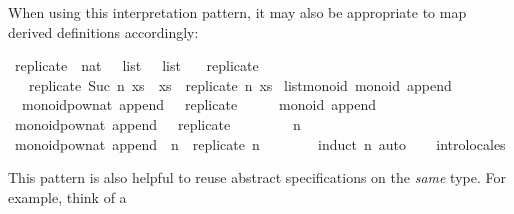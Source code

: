 \begin{isabellebody}
\begin{isamarkuptext}
  When using this interpretation pattern, it may also
  be appropriate to map derived definitions accordingly:%
\end{isamarkuptext}%
\isamarkuptrue%
%
\isadelimquote
%
\endisadelimquote
%
\isatagquote
{}\isamarkupfalse%
\ replicate\ {\isacharcolon}{\isacharcolon}\ {\isachardoublequoteopen}nat\ {\isasymRightarrow}\ {\isasymalpha}\ list\ {\isasymRightarrow}\ {\isasymalpha}\ list{\isachardoublequoteclose}\ \isanewline
\ \ {\isachardoublequoteopen}replicate\ {}\ {\isacharunderscore}\ {\isacharequal}\ {\isacharbrackleft}{\isacharbrackright}{\isachardoublequoteclose}\isanewline
\ \ {\isacharbar}\ {\isachardoublequoteopen}replicate\ {\isacharparenleft}Suc\ n{\isacharparenright}\ xs\ {\isacharequal}\ xs\ {\isacharat}\ replicate\ n\ xs{\isachardoublequoteclose}\isanewline
\isanewline
{}\isamarkupfalse%
\ list{\isacharunderscore}monoid{\isacharcolon}\ monoid\ append\ {\isachardoublequoteopen}{\isacharbrackleft}{\isacharbrackright}{\isachardoublequoteclose}\ \isanewline
\ \ {\isachardoublequoteopen}monoid{\isachardot}pow{\isacharunderscore}nat\ append\ {\isacharbrackleft}{\isacharbrackright}\ {\isacharequal}\ replicate{\isachardoublequoteclose}\isanewline
{}\isamarkupfalse%
\ {\isacharminus}\isanewline
\ \ \isamarkupfalse%
\ monoid\ append\ {\isachardoublequoteopen}{\isacharbrackleft}{\isacharbrackright}{\isachardoublequoteclose}\ \isacommand{{\isachardot}{\isachardot}}\isamarkupfalse%
\isanewline
\ \ \isamarkupfalse%
\ {\isachardoublequoteopen}monoid{\isachardot}pow{\isacharunderscore}nat\ append\ {\isacharbrackleft}{\isacharbrackright}\ {\isacharequal}\ replicate{\isachardoublequoteclose}\isanewline
\ \ \isamarkupfalse%
\isanewline
\ \ \ \ \isamarkupfalse%
\ n\isanewline
\ \ \ \ \isamarkupfalse%
\ {\isachardoublequoteopen}monoid{\isachardot}pow{\isacharunderscore}nat\ append\ {\isacharbrackleft}{\isacharbrackright}\ n\ {\isacharequal}\ replicate\ n{\isachardoublequoteclose}\isanewline
\ \ \ \ \ \ \isamarkupfalse%
\ {\isacharparenleft}induct\ n{\isacharparenright}\ auto\isanewline
\ \ \isamarkupfalse%
\isanewline
{}\isamarkupfalse%
\ intro{\isacharunderscore}locales%
\endisatagquote
{\isafoldquote}%
%
\isadelimquote
%
\endisadelimquote
%
\begin{isamarkuptext}%
\noindent This pattern is also helpful to reuse abstract
  specifications on the \emph{same} type.  For example, think of a

\end{isamarkuptext}
\end{isabellebody}
